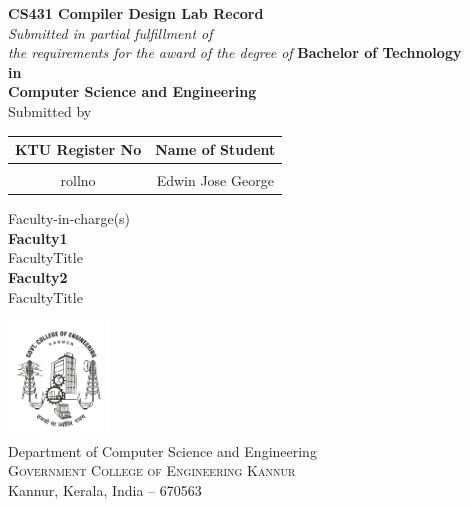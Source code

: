 \begin{titlepage}
	\clearpage
	\vspace*{\fill}
	\thispagestyle{empty}
	\begin{onehalfspace}
	\begin{center}
			
		\textup{\large{\bf CS431 Compiler Design Lab Record}}
		\\[0.2in]
		
       \small \emph{Submitted in partial fulfillment of\\ the requirements for the award of the degree of}
		\vspace{.2in}
		{\bf Bachelor of Technology \\in\\ Computer Science and Engineering}\\[0.5in]
		
		\normalsize Submitted by \\
		\begin{table}[h]
			\centering
			\begin{tabular}{cc}
				KTU Register No & Name of Student
				\\ \hline \\
				rollno      & Edwin Jose George
			\end{tabular}
		\end{table}
		
		\vspace{.1in}
		Faculty-in-charge(s)\\ [0.1in]
		\textbf{Faculty1}\\ 
		FacultyTitle\\ [0.1in]
		\textbf{Faculty2}\\
		FacultyTitle \\ [0.2in]
		
		\vfill
	
		\includegraphics[width=0.2\textwidth]{./gcek_logo.jpg}\\[0.1in]
		\Large{Department of Computer Science and Engineering}\\
		\normalsize \textsc{Government College of Engineering Kannur}\\ Kannur, Kerala, India -- 670563 \\
		\vspace{0.2cm}
	
	\end{center}
	\end{onehalfspace}
	\vspace*{\fill}
\end{titlepage}
